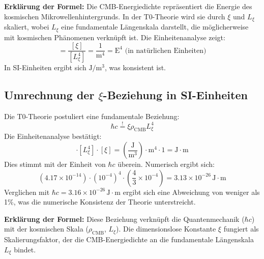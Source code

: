 \documentclass[12pt,a4paper]{article}
\begin{document}
\textbf{Erklärung der Formel:} Die CMB-Energiedichte repräsentiert die Energie des kosmischen Mikrowellenhintergrunds. In der T0-Theorie wird sie durch $\xi$ und $L_\xi$ skaliert, wobei $L_\xi$ eine fundamentale Längenskala darstellt, die möglicherweise mit kosmischen Phänomenen verknüpft ist. Die Einheitenanalyse zeigt:
\begin{equation}
	[\rho_{\text{CMB}}] = \frac{[\xi]}{[L_\xi^4]} = \frac{1}{\text{m}^4} = \text{E}^4 \text{ (in natürlichen Einheiten)}
\end{equation}
In SI-Einheiten ergibt sich $\text{J}/\text{m}^3$, was konsistent ist.

\subsection{Umrechnung der $\xi$-Beziehung in SI-Einheiten}
Die T0-Theorie postuliert eine fundamentale Beziehung:
\begin{equation}
	\hbar c \stackrel{!}{=} \xi \rho_{\text{CMB}} L_\xi^4
\end{equation}
Die Einheitenanalyse bestätigt:
\begin{equation}
	[\rho_{\text{CMB}}] \cdot [L_\xi^4] \cdot [\xi] = \left( \frac{\text{J}}{\text{m}^3} \right) \cdot \text{m}^4 \cdot 1 = \text{J} \cdot \text{m}
\end{equation}
Dies stimmt mit der Einheit von $\hbar c$ überein. Numerisch ergibt sich:
\begin{equation}
	\left( 4.17 \times 10^{-14} \right) \cdot \left( 10^{-4} \right)^4 \cdot \left( \frac{4}{3} \times 10^{-4} \right) = 3.13 \times 10^{-26} \, \text{J} \cdot \text{m}
\end{equation}
Verglichen mit $\hbar c = 3.16 \times 10^{-26} \, \text{J} \cdot \text{m}$ ergibt sich eine Abweichung von weniger als 1\%, was die numerische Konsistenz der Theorie unterstreicht.

\textbf{Erklärung der Formel:} Diese Beziehung verknüpft die Quantenmechanik ($\hbar c$) mit der kosmischen Skala ($\rho_{\text{CMB}}$, $L_\xi$). Die dimensionslose Konstante $\xi$ fungiert als Skalierungsfaktor, der die CMB-Energiedichte an die fundamentale Längenskala $L_\xi$ bindet.
\end{document}
